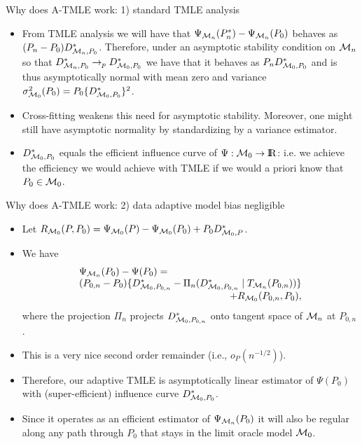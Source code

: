 \documentclass[t]{beamer}
\newlength{\wideitemsep}
\let\olditem\item
\renewcommand{\item}{\setlength{\itemsep}{\wideitemsep}\olditem}
\newcommand{\openr}{\hbox{${\rm I\kern-.2em R}$}}
\begin{document}
\begin{frame}{Why does A-TMLE work: 1) standard TMLE analysis}
\begin{itemize}
\item From TMLE analysis we will have that $\Psi_{{\cal M}_n}(P_n^*)-\Psi_{{\cal M}_n}(P_0)$ behaves as $(P_n-P_0)D^*_{{\cal M}_n,P_0}$. Therefore, under an asymptotic stability condition on ${\cal M}_n$ so that $D^*_{{\cal M}_n,P_0}\rightarrow_p D^*_{{\cal M}_0,P_0}$ we have that it behaves as $P_n D^*_{{\cal M}_0,P_0}$ and is thus asymptotically normal with mean zero and variance $\sigma^2_{{\cal M}_0}(P_0)=P_0\{D^*_{{\cal M}_0,P_0}\}^2$.
\item Cross-fitting weakens this need for asymptotic stability. Moreover, one might still have asymptotic normality by standardizing by a variance estimator.
\item $D^*_{{\cal M}_0,P_0}$ equals the efficient influence curve of $\Psi:{\cal M}_0\rightarrow \openr$: i.e. we achieve the efficiency we would achieve with TMLE if we would  a priori know that $P_0\in {\cal M}_0$.
\end{itemize}
\end{frame}
\begin{frame}{Why does A-TMLE work: 2) data adaptive model bias negligible}
\begin{itemize}
\item Let $R_{{\cal M}_0}(P,P_0)=\Psi_{{\cal M}_0}(P)-\Psi_{{\cal M}_0}(P_0)+P_0 D^*_{{\cal M}_0,P}$.
\item We have
\[
\begin{array}{l}
\Psi_{{\cal M}_n}(P_0)-\Psi(P_0)=\\
(P_{0,n}-P_0)\{D^*_{{\cal M}_0,P_{0,n}}-\Pi_n(D^*_{{\cal M}_0,P_{0,n}}\mid T_{{\cal  M}_n}(P_{0,n}))\}\\
\hfill +R_{{\cal M}_0}(P_{0,n},P_0),
\end{array}
\]
where the projection $\Pi_n$ projects $D^*_{{\cal M}_0,P_{0,n}}$ onto tangent space of ${\cal M}_n$ at $P_{0,n}$.
\end{itemize}
\end{frame}
\begin{frame}
\begin{itemize}
\item This is a very nice second order remainder (i.e., $o_P(n^{-1/2})$).
\item Therefore, our adaptive TMLE is asymptotically linear estimator of $\Psi(P_0)$ with (super-efficient) influence curve $D^*_{{\cal M}_0,P_0}$.
\item Since it operates as an efficient estimator of $\Psi_{{\cal M}_n}(P_0)$ it will also be regular along any path through $P_0$ that stays in the limit oracle model ${\cal M}_0$.
\end{itemize}
\end{frame}
\end{document}
